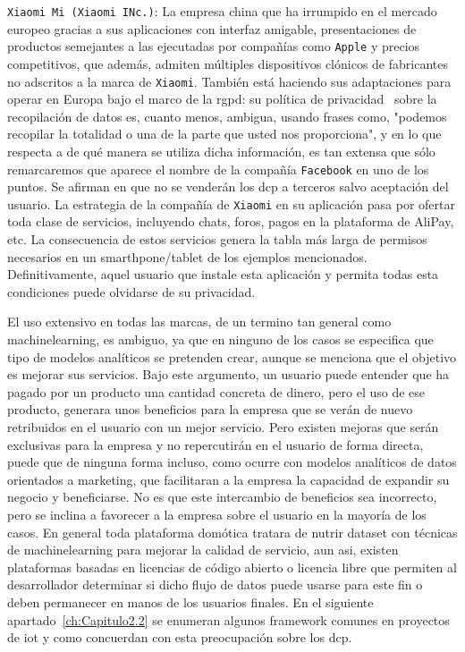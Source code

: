 \verb|Xiaomi Mi (Xiaomi INc.)|: La empresa china que ha irrumpido en el mercado europeo gracias a sus aplicaciones con interfaz amigable, presentaciones de productos semejantes a las ejecutadas por compañías como \verb|Apple| y precios competitivos, que además, admiten múltiples dispositivos clónicos de fabricantes no adscritos a la marca de \verb|Xiaomi|. También está haciendo sus adaptaciones para operar en Europa bajo el marco de la \gls{rgpd}: su política de privacidad~\cite{xiaomyprivacy} sobre la recopilación de datos es, cuanto menos, ambigua, usando frases como, "podemos recopilar la totalidad o una de la parte que usted nos proporciona", y en lo que respecta a de qué manera se utiliza dicha información, es tan extensa que sólo remarcaremos que aparece el nombre de la compañía \verb|Facebook| en uno de los puntos. Se afirman en que no se venderán los \gls{dcp} a terceros salvo aceptación del usuario. La estrategia de la compañía de \verb|Xiaomi| en su aplicación pasa por ofertar toda clase de servicios, incluyendo chats, foros, pagos en la plataforma de AliPay, etc. La consecuencia de estos servicios genera la tabla más larga de permisos necesarios en un smarthpone/tablet de los ejemplos mencionados. Definitivamente, aquel usuario que instale esta aplicación y permita todas esta condiciones puede olvidarse de su privacidad.


\vspace{1cm}

El uso extensivo en todas las marcas, de un termino tan general como \gls{machinelearning}, es ambiguo, ya que en ninguno de los casos se especifica que tipo de modelos analíticos se pretenden crear, aunque se menciona que el objetivo es mejorar sus servicios. Bajo este argumento, un usuario puede entender que ha pagado por un producto una cantidad concreta de dinero, pero el uso de ese producto, generara unos beneficios para la empresa que se verán de nuevo retribuidos en el usuario con un mejor servicio. Pero existen mejoras que serán exclusivas para la empresa y no repercutirán en el usuario de forma directa, puede que de ninguna forma incluso, como ocurre con modelos analíticos de datos orientados a marketing, que facilitaran  a la empresa la capacidad de expandir su negocio y beneficiarse. No es que este intercambio de beneficios sea incorrecto, pero se inclina a favorecer a la empresa sobre el usuario en la mayoría de los casos. En general toda plataforma domótica tratara de nutrir \gls{dataset} con técnicas de \gls{machinelearning} para mejorar la calidad de servicio, aun asi, existen plataformas basadas en licencias de código abierto o licencia libre que permiten al desarrollador determinar si dicho flujo de datos puede usarse para este fin o deben permanecer en manos de los usuarios finales. En el siguiente apartado~\ref{ch:Capitulo2.2} se enumeran algunos \gls{framework} comunes en proyectos de \gls{iot} y como concuerdan con esta preocupación sobre los \gls{dcp}.


